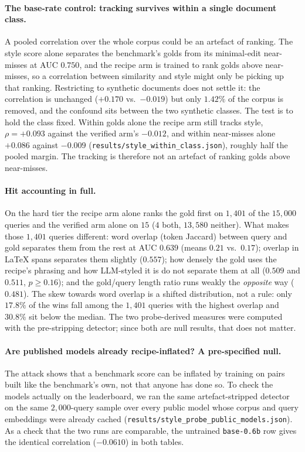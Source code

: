 \paragraph{The base-rate control: tracking survives within a single document class.}A pooled correlation over the whole corpus could be an artefact of ranking. The style score alone separates the benchmark's golds from its minimal-edit near-misses at AUC $0.750$, and the recipe arm is trained to rank golds above near-misses, so a correlation between similarity and style might only be picking up that ranking. Restricting to synthetic documents does not settle it: the correlation is unchanged ($+0.170$ vs.\ $-0.019$) but only $1.42\%$ of the corpus is removed, and the confound sits between the two synthetic classes. The test is to hold the class fixed. Within golds alone the recipe arm still tracks style, $\rho = +0.093$ against the verified arm's $-0.012$, and within near-misses alone $+0.086$ against $-0.009$ (\texttt{results/style\_within\_class.json}), roughly half the pooled margin. The tracking is therefore not an artefact of ranking golds above near-misses.

\paragraph{Hit accounting in full.}
On the hard tier the recipe arm alone ranks the gold first on $1{,}401$ of the $15{,}000$ queries and the verified arm alone on $15$ ($4$ both, $13{,}580$ neither). What makes those $1{,}401$ queries different: word overlap (token Jaccard) between query and gold separates them from the rest at AUC $0.639$ (means $0.21$ vs.\ $0.17$); overlap in \LaTeX{} spans separates them slightly ($0.557$); how densely the gold uses the recipe's phrasing and how LLM-styled it is do not separate them at all ($0.509$ and $0.511$, $p \ge 0.16$); and the gold/query length ratio runs weakly the \emph{opposite} way ($0.481$). The skew towards word overlap is a shifted distribution, not a rule: only $17.8\%$ of the wins fall among the $1{,}401$ queries with the highest overlap and $30.8\%$ sit below the median. The two probe-derived measures were computed with the pre-stripping detector; since both are null results, that does not matter.

\paragraph{Are published models already recipe-inflated? A pre-specified null.}The attack shows that a benchmark score can be inflated by training on pairs built like the benchmark's own, not that anyone has done so. To check the models actually on the leaderboard, we ran the same artefact-stripped detector on the same $2{,}000$-query sample over every public model whose corpus and query embeddings were already cached (\texttt{results/style\_probe\_public\_models.json}). As a check that the two runs are comparable, the untrained \texttt{base-0.6b} row gives the identical correlation ($-0.0610$) in both tables.

